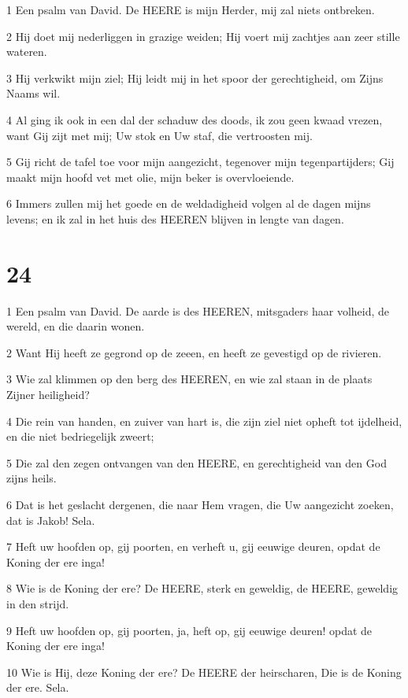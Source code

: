 \par 1 Een psalm van David. De HEERE is mijn Herder, mij zal niets ontbreken.
\par 2 Hij doet mij nederliggen in grazige weiden; Hij voert mij zachtjes aan zeer stille wateren.
\par 3 Hij verkwikt mijn ziel; Hij leidt mij in het spoor der gerechtigheid, om Zijns Naams wil.
\par 4 Al ging ik ook in een dal der schaduw des doods, ik zou geen kwaad vrezen, want Gij zijt met mij; Uw stok en Uw staf, die vertroosten mij.
\par 5 Gij richt de tafel toe voor mijn aangezicht, tegenover mijn tegenpartijders; Gij maakt mijn hoofd vet met olie, mijn beker is overvloeiende.
\par 6 Immers zullen mij het goede en de weldadigheid volgen al de dagen mijns levens; en ik zal in het huis des HEEREN blijven in lengte van dagen.

\chapter{24}

\par 1 Een psalm van David. De aarde is des HEEREN, mitsgaders haar volheid, de wereld, en die daarin wonen.
\par 2 Want Hij heeft ze gegrond op de zeeen, en heeft ze gevestigd op de rivieren.
\par 3 Wie zal klimmen op den berg des HEEREN, en wie zal staan in de plaats Zijner heiligheid?
\par 4 Die rein van handen, en zuiver van hart is, die zijn ziel niet opheft tot ijdelheid, en die niet bedriegelijk zweert;
\par 5 Die zal den zegen ontvangen van den HEERE, en gerechtigheid van den God zijns heils.
\par 6 Dat is het geslacht dergenen, die naar Hem vragen, die Uw aangezicht zoeken, dat is Jakob! Sela.
\par 7 Heft uw hoofden op, gij poorten, en verheft u, gij eeuwige deuren, opdat de Koning der ere inga!
\par 8 Wie is de Koning der ere? De HEERE, sterk en geweldig, de HEERE, geweldig in den strijd.
\par 9 Heft uw hoofden op, gij poorten, ja, heft op, gij eeuwige deuren! opdat de Koning der ere inga!
\par 10 Wie is Hij, deze Koning der ere? De HEERE der heirscharen, Die is de Koning der ere. Sela.

